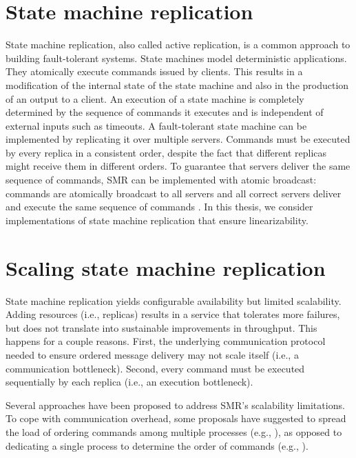 \section{State machine replication}
\label{sec:smr}
State machine replication, also called active replication, is a common approach
to building fault-tolerant systems\cite{Lam78, Sch90}. State machines model
deterministic applications. They atomically execute commands issued by clients.
This results in a modification of the internal state of the state machine and
also in the production of an output to a client. An execution of a state machine
is completely determined by the sequence of commands it executes and is
independent of external inputs such as timeouts. A fault-tolerant state machine
can be implemented by replicating it over multiple servers. Commands must be
executed by every replica in a consistent order, despite the fact that different
replicas might receive them in different orders. To guarantee that servers
deliver the same sequence of commands, SMR can be implemented with atomic
broadcast: commands are atomically broadcast to all servers and all correct
servers deliver and execute the same sequence of commands \cite{BJ87b,DSU04}. In
this thesis, we consider implementations of state machine replication that
ensure linearizability.

\section{Scaling state machine replication}

State machine replication yields configurable availability but limited
scalability. Adding resources (i.e., replicas) results in a service that
tolerates more failures, but does not translate into sustainable improvements in
throughput. This happens for a couple reasons. First, the underlying
communication protocol needed to ensure ordered message delivery may not scale
itself (i.e., a communication bottleneck). Second, every command must be
executed sequentially by each replica (i.e., an execution bottleneck).

Several approaches have been proposed to address SMR's scalability limitations.
To cope with communication overhead, some proposals have suggested to spread the
load of ordering commands among multiple processes (e.g.,
\cite{Moraru:2013gw,Mencius,Marandi:2012hb}), as opposed to dedicating a single
process to determine the order of commands (e.g.,
\cite{Lam98}).%

